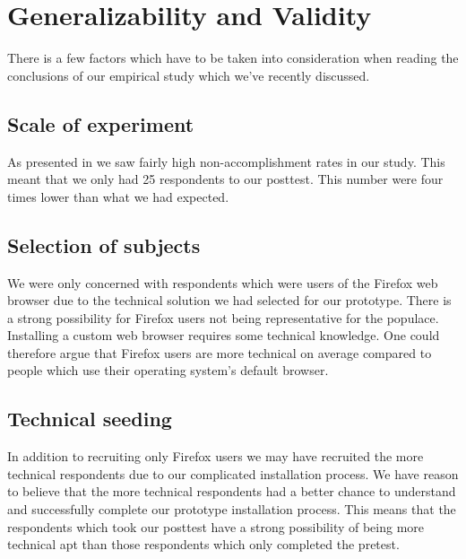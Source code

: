\section{Generalizability and Validity}

\removeline

There is a few factors which have to be taken into consideration when reading
the conclusions of our empirical study which we've recently discussed.

\subsection{Scale of experiment}

As presented in 
we saw fairly high non-accomplishment rates in our study. This meant
that we only had 25 respondents to our posttest. This number were four times
lower than what we had expected.%

\subsection{Selection of subjects}

We were only
concerned with respondents which were users of the Firefox web browser
due to the technical solution we had selected for our prototype.
There is a strong possibility for Firefox users not being representative for
the \urort{} populace. Installing a custom web browser%
requires some technical knowledge. One could therefore argue that Firefox
users are more technical on average compared to people which use their
operating system's default browser.

\subsection{Technical seeding}

In addition to recruiting only Firefox users we may have recruited the more
technical respondents due to our complicated installation process. We have
reason to believe that the more technical respondents had a better chance to
understand and successfully complete our prototype installation process. This
means that the respondents which took our posttest have a strong possibility of
being more technical apt than those respondents which only completed the
pretest.

